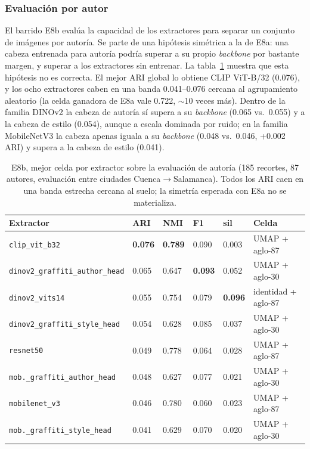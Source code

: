 \subsubsection{Evaluación por autor}
\label{subsubsec:res-autor}
El barrido E8b evalúa la capacidad de los extractores para separar un conjunto
de imágenes por autoría. Se parte de una hipótesis simétrica a la de E8a: una
cabeza entrenada para autoría podría superar a su propio \textit{backbone} por
bastante margen, y superar a los extractores sin entrenar. La
tabla~\ref{tab:e8b-best} muestra que esta hipótesis no es correcta. El mejor
ARI global lo obtiene CLIP ViT-B/32 (0.076), y los ocho extractores caben en
una banda 0.041--0.076 cercana al agrupamiento aleatorio (la celda ganadora de
E8a vale 0.722, $\sim$10 veces más). Dentro de la familia DINOv2 la cabeza de
autoría sí supera a su \textit{backbone} (0.065 vs.\ 0.055) y a la cabeza de
estilo (0.054), aunque a escala dominada por ruido; en la familia MobileNetV3
la cabeza apenas iguala a su \textit{backbone} (0.048 vs.\ 0.046, +0.002 ARI)
y supera a la cabeza de estilo (0.041).

\begin{table}[h]
  \centering
{\footnotesize
\begin{tabular}{|p{5.4cm}|p{1.2cm}|p{1.0cm}|p{1.0cm}|p{1.0cm}|p{3.5cm}|} \hline
  \textbf{Extractor} & \textbf{ARI} & \textbf{NMI} & \textbf{F1} & \textbf{sil} & \textbf{Celda} \\ \hline
  \texttt{clip\_vit\_b32}                     & \textbf{0.076} & \textbf{0.789} & 0.090 & 0.003 & UMAP + aglo-87 \\ \hline
  \texttt{dinov2\_graffiti\_author\_head}     & 0.065 & 0.647 & \textbf{0.093} & 0.052 & UMAP + aglo-30 \\ \hline
  \texttt{dinov2\_vits14}                     & 0.055 & 0.754 & 0.079 & \textbf{0.096} & identidad + aglo-87 \\ \hline
  \texttt{dinov2\_graffiti\_style\_head}      & 0.054 & 0.628 & 0.085 & 0.037 & UMAP + aglo-30 \\ \hline
  \texttt{resnet50}                           & 0.049 & 0.778 & 0.064 & 0.028 & UMAP + aglo-87 \\ \hline
  \texttt{mob.\_graffiti\_author\_head}       & 0.048 & 0.627 & 0.077 & 0.021 & UMAP + aglo-30 \\ \hline
  \texttt{mobilenet\_v3}                      & 0.046 & 0.780 & 0.060 & 0.023 & UMAP + aglo-87 \\ \hline
  \texttt{mob.\_graffiti\_style\_head}        & 0.041 & 0.629 & 0.070 & 0.020 & UMAP + aglo-30 \\ \hline
\end{tabular}
}
  \caption[E8b, mejor celda por extractor (autoría)]{E8b, mejor celda por extractor sobre la evaluación de autoría
  (185 recortes, 87 autores, evaluación entre ciudades Cuenca$\to$Salamanca).
  Todos los ARI caen en una banda estrecha cercana al suelo; la simetría
  esperada con E8a no se materializa.}
  \label{tab:e8b-best}
\end{table}

